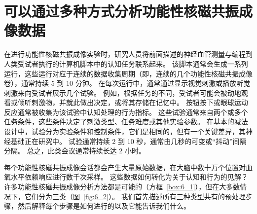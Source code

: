 \section{可以通过多种方式分析功能性核磁共振成像数据}

在进行功能性核磁共振成像实验时，研究人员将前面描述的神经血管测量与编程到人类受试者执行的计算机脚本中的认知任务联系起来。
该脚本通常会生成一系列运行，这些运行对应于连续的数据收集周期（即，连续的几个功能性核磁共振成像卷），通常持续 5 到 10 分钟。 
在每次运行中，通常通过显示视觉刺激或播放听觉刺激来向受试者展示几个试验。 
例如，根据任务的不同，受试者可能会被动地观看或倾听刺激物，并就此做出决定，或将其存储在记忆中。 
按钮按下或眼球运动反应通常被收集为该试验中认知处理的行为指标。 
这些试验通常来自两个或多个任务条件，这些条件决定了刺激类型、任务难度或其他实验参数。 
在基本的减法设计中，试验分为实验条件和控制条件，它们是相同的，但有一个关键差异，其神经基础正在研究中。 
试验通常持续 2 到 10 秒，通常由几秒的可变或“抖动”间隔分隔。 
总之，此类会议通常持续长达 2 小时。


每个功能性核磁共振成像会话都会产生大量原始数据，在大脑中数十万个位置对血氧水平依赖响应进行数千次采样。 
这些数据如何转化为关于认知和行为的见解？ 
许多功能性核磁共振成像分析方法都是可能的（方框~\ref{box:6_1}），但在大多数情况下，它们分为三类（图~\ref{fig:6_2}）。 
我们首先描述所有三种类型共有的预处理步骤，然后解释每个步骤是如何进行的以及它能告诉我们什么。


